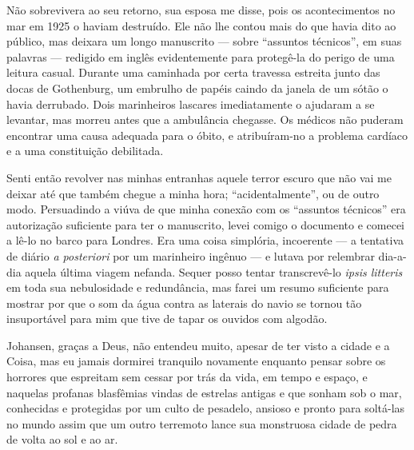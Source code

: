 \begin{pages}
\begin{Rightside}
Não sobrevivera ao seu retorno, sua esposa me disse, pois os
acontecimentos no mar em 1925 o haviam destruído. Ele não lhe contou
mais do que havia dito ao público, mas deixara um longo manuscrito ---
sobre ``assuntos técnicos'', em suas palavras --- redigido em inglês
evidentemente para protegê-la do perigo de uma leitura casual. Durante
uma caminhada por certa travessa estreita junto das docas de Gothenburg,
um embrulho de papéis caindo da janela de um sótão o havia derrubado.
Dois marinheiros lascares
imediatamente o ajudaram a se levantar, mas morreu antes que a
ambulância chegasse. Os médicos não puderam encontrar uma causa adequada
para o óbito, e atribuíram-no a problema cardíaco e a uma constituição
debilitada.

Senti então revolver nas minhas entranhas aquele terror escuro que não
vai me deixar até que também chegue a minha hora; ``acidentalmente'', ou
de outro modo. Persuadindo a viúva de que minha conexão com os
``assuntos técnicos'' era autorização suficiente para ter o manuscrito,
levei comigo o documento e comecei a lê-lo no barco para Londres. Era
uma coisa simplória, incoerente --- a tentativa de diário \emph{a
posteriori} por um marinheiro ingênuo --- e lutava por relembrar
dia-a-dia aquela última viagem nefanda. Sequer posso tentar
transcrevê-lo \emph{ipsis litteris} em toda sua nebulosidade e
redundância, mas farei um resumo suficiente para mostrar por que o som
da água contra as laterais do navio se tornou tão insuportável para mim
que tive de tapar os ouvidos com algodão.

Johansen, graças a Deus, não entendeu muito, apesar de ter visto a
cidade e a Coisa, mas eu jamais dormirei tranquilo novamente enquanto
pensar sobre os horrores que espreitam sem cessar por trás da vida, em
tempo e espaço, e naquelas profanas blasfêmias vindas de estrelas
antigas e que sonham sob o mar, conhecidas e protegidas por um culto de
pesadelo, ansioso e pronto para soltá-las no mundo assim que um outro
terremoto lance sua monstruosa cidade de pedra de volta ao sol e ao ar.


\end{Rightside}
\end{pages}
